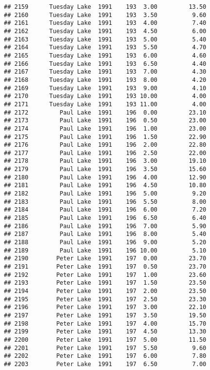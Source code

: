 \documentclass[
]{article}
\begin{document}
\begin{verbatim}
## 2159      Tuesday Lake  1991    193  3.00         13.50
## 2160      Tuesday Lake  1991    193  3.50          9.60
## 2161      Tuesday Lake  1991    193  4.00          7.40
## 2162      Tuesday Lake  1991    193  4.50          6.00
## 2163      Tuesday Lake  1991    193  5.00          5.40
## 2164      Tuesday Lake  1991    193  5.50          4.70
## 2165      Tuesday Lake  1991    193  6.00          4.60
## 2166      Tuesday Lake  1991    193  6.50          4.40
## 2167      Tuesday Lake  1991    193  7.00          4.30
## 2168      Tuesday Lake  1991    193  8.00          4.20
## 2169      Tuesday Lake  1991    193  9.00          4.10
## 2170      Tuesday Lake  1991    193 10.00          4.00
## 2171      Tuesday Lake  1991    193 11.00          4.00
## 2172         Paul Lake  1991    196  0.00         23.10
## 2173         Paul Lake  1991    196  0.50         23.00
## 2174         Paul Lake  1991    196  1.00         23.00
## 2175         Paul Lake  1991    196  1.50         22.90
## 2176         Paul Lake  1991    196  2.00         22.80
## 2177         Paul Lake  1991    196  2.50         22.00
## 2178         Paul Lake  1991    196  3.00         19.10
## 2179         Paul Lake  1991    196  3.50         15.60
## 2180         Paul Lake  1991    196  4.00         12.90
## 2181         Paul Lake  1991    196  4.50         10.80
## 2182         Paul Lake  1991    196  5.00          9.20
## 2183         Paul Lake  1991    196  5.50          8.00
## 2184         Paul Lake  1991    196  6.00          7.20
## 2185         Paul Lake  1991    196  6.50          6.40
## 2186         Paul Lake  1991    196  7.00          5.90
## 2187         Paul Lake  1991    196  8.00          5.40
## 2188         Paul Lake  1991    196  9.00          5.20
## 2189         Paul Lake  1991    196 10.00          5.10
## 2190        Peter Lake  1991    197  0.00         23.70
## 2191        Peter Lake  1991    197  0.50         23.70
## 2192        Peter Lake  1991    197  1.00         23.60
## 2193        Peter Lake  1991    197  1.50         23.50
## 2194        Peter Lake  1991    197  2.00         23.50
## 2195        Peter Lake  1991    197  2.50         23.30
## 2196        Peter Lake  1991    197  3.00         22.10
## 2197        Peter Lake  1991    197  3.50         19.50
## 2198        Peter Lake  1991    197  4.00         15.70
## 2199        Peter Lake  1991    197  4.50         13.30
## 2200        Peter Lake  1991    197  5.00         11.50
## 2201        Peter Lake  1991    197  5.50          9.60
## 2202        Peter Lake  1991    197  6.00          7.80
## 2203        Peter Lake  1991    197  6.50          7.00

\end{verbatim}
\end{document}

